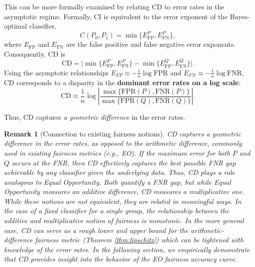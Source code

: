 \documentclass[11pt,letterpaper]{article}
\newtheorem{remark}{Remark}
\begin{document}

This can be more formally examined by relating CD to error rates in the asymptotic regime. Formally, CI is equivalent to the error exponent of the Bayes-optimal classifier,
\begin{equation}
C(P_0,P_1) = \min\{E_{\mathrm{FP}}^P, E_{\mathrm{FN}}^P\},
\end{equation}
where $E_{\mathrm{FP}}$ and $E_{\mathrm{FN}}$ are the false positive and false negative error exponents. Consequently, CD is
\begin{equation}
\mathrm{CD}
=
\bigl|
\min\{E_{\mathrm{FP}}^P,E_{\mathrm{FN}}^P\}
-
\min\{E_{\mathrm{FP}}^Q,E_{\mathrm{FN}}^Q\}
\bigr|.
\end{equation}
Using the asymptotic relationships $E_{FP} \approx -\frac{1}{n}\log \text{FPR}$ and $E_{FN} \approx -\frac{1}{n}\log \text{FNR}$, CD corresponds to a disparity in the \textbf{dominant error rates on a log scale}:
\begin{equation}
\label{eq:log-error}
\mathrm{CD}
\approx
\frac{1}{n}\log \left|\frac{\max\{\mathrm{FPR}(P),\mathrm{FNR}(P)\}}{\max\{\mathrm{FPR}(Q),\mathrm{FNR}(Q)\}}\right|.
\end{equation}

Thus, CD captures \textit{a geometric difference} in the error rates.

\begin{remark} [Connection to existing fairness notions] CD captures \textit{a geometric difference} in the error rates, as opposed to  the arithmetic difference, commonly used in existing fairness metrics (e.g., EO). If the maximum error for both $P$ and $Q$ occurs at the FNR, then CD effectively captures the best possible FNR gap achievable by any classifier given the underlying data. Thus, CD plays a role analogous to Equal Opportunity. Both quantify a FNR gap, but while Equal Opportunity measures an additive difference, CD measures a multiplicative one. While these notions are not equivalent, they are related in meaningful ways. In the case of a fixed classifier for a single group, the relationship between the additive and multiplicative notion of fairness is monotonic. In the more general case, CD can serve as a rough lower and upper bound for the arithmetic-difference fairness metric (Theorem \ref{thm:lipschitz}) which can be tightened with knowledge of the error rates. In the following section, we empirically demonstrate that CD provides insight into the behavior of the EO fairness accuracy curve.
\end{remark}
\end{document}
